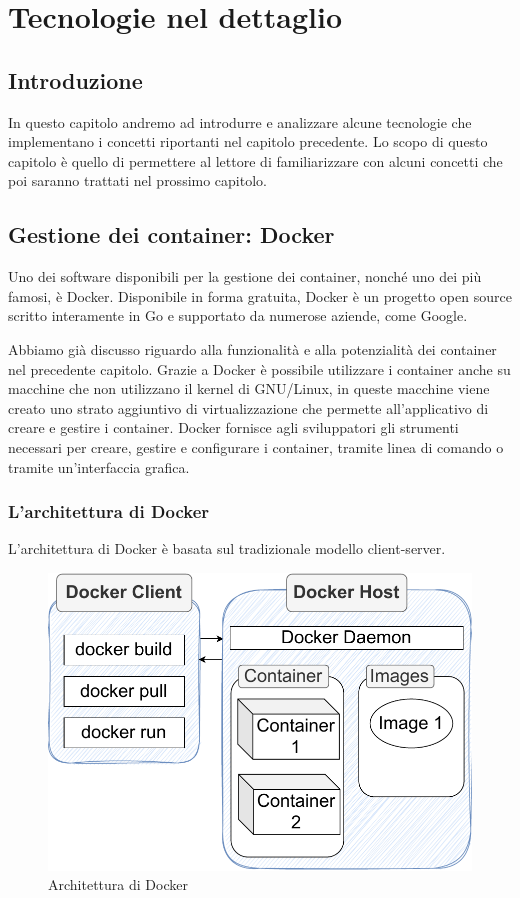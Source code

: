 \chapter{Tecnologie nel dettaglio}
\section{Introduzione}
In questo capitolo andremo ad introdurre e analizzare alcune tecnologie che implementano i concetti riportanti nel capitolo precedente. Lo scopo di questo capitolo è quello di permettere al lettore di familiarizzare con alcuni concetti che poi saranno trattati nel prossimo capitolo.

\section{Gestione dei container: Docker}
Uno dei software disponibili per la gestione dei container, nonché uno dei più famosi, è Docker. Disponibile in forma gratuita, Docker è un progetto open source scritto interamente in Go e supportato da numerose aziende, come Google.

Abbiamo già discusso riguardo alla funzionalità e alla potenzialità dei container nel precedente capitolo. Grazie a Docker è possibile utilizzare i container anche su macchine che non utilizzano il kernel di GNU/Linux, in queste macchine viene creato uno strato aggiuntivo di virtualizzazione che permette all'applicativo di creare e gestire i container. Docker fornisce agli sviluppatori gli strumenti necessari per creare, gestire e configurare i container, tramite linea di comando o tramite un'interfaccia grafica.

\subsection{L'architettura di Docker}
L'architettura di Docker è basata sul tradizionale modello client-server.

\begin{figure}[h]
    \centering
    \includegraphics[scale=0.65]{capitoli/immagini/08_docker_architecture.pdf}
    \caption{Architettura di Docker}
    \label{fig:docker_arch}
\end{figure}

